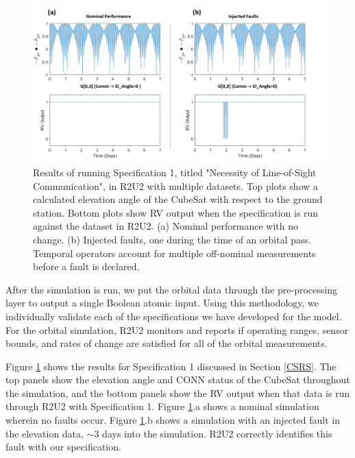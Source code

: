 \documentclass[conf]{new-aiaa}
\begin{document}
\begin{figure}[!ht]
\centering
\includegraphics[width=.8\textwidth]{Fig/LOSEL_Spec1.png}
\caption{Results of running Specification 1, titled "Necessity of Line-of-Sight Communication", in R2U2 with multiple datasets. Top plots show a calculated elevation angle of the CubeSat with respect to the ground station. Bottom plots show RV output when the specification is run against the dataset in R2U2. (a) Nominal performance with no change. (b) Injected faults, one during the time of an orbital pass. Temporal operators account for multiple off-nominal measurements before a fault is declared.}
\label{ConnElSpecResults}
\end{figure}

After the simulation is run, we put the orbital data through the pre-processing layer to output a single Boolean atomic input. Using this methodology, we individually validate each of the specifications we have developed for the model. For the orbital simulation, R2U2 monitors and reports if operating ranges, sensor bounds, and rates of change are satisfied for all of the orbital measurements.

Figure \ref{ConnElSpecResults} shows the results for Specification 1 discussed in Section \ref{CSRS}. The top panels show the elevation angle and CONN status of the CubeSat throughout the simulation, and the bottom panels show the RV output when that data is run through R2U2 with Specification 1. Figure \ref{ConnElSpecResults}.a shows a nominal simulation wherein no faults occur. Figure \ref{ConnElSpecResults}.b shows a simulation with an injected fault in the elevation data, $\sim$3 days into the simulation. R2U2 correctly identifies this fault with our specification.
\end{document}
